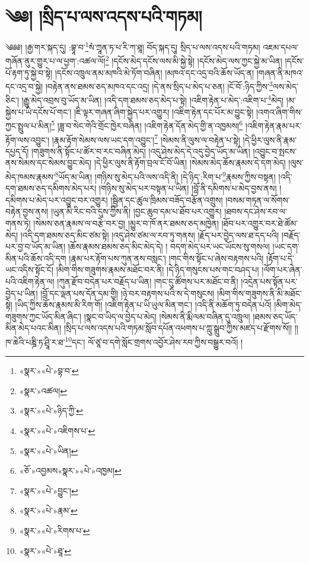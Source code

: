 \chapter{༄༅། །སྲིད་པ་ལས་འདས་པའི་གཏམ།}༄༅༅། །རྒྱ་གར་སྐད་དུ། :བྷཱ་བ་\footnote{«སྣར་»«པེ་»བྷ་བ་}སཾ་ཀྲཱན་ཏ་པ་རི་ཀ་ཐཱ། བོད་སྐད་དུ། སྲིད་པ་ལས་འདས་པའི་གཏམ། འཇམ་དཔལ་གཞོན་ནུར་གྱུར་པ་ལ་ཕྱག་:འཚལ་ལོ།\footnote{«སྣར་»འཚལ།} །དངོས་མེད་དངོས་ལས་མི་སྐྱེ་སྟེ། །དངོས་མེད་ལས་ཀྱང་སྐྱེ་མ་ཡིན། །དངོས་པོ་རྟག་ཏུ་སྐྱེ་བ་སྟེ། །དངོས་འཁྲུལ་ནམ་མཁའི་མེ་ཏོག་བཞིན། །མཁའ་དང་འདྲ་བའི་ཆོས་ཡོད་ན། །གཞན་ནི་མཁའ་དང་འདྲ་བ་སྐྱེ། །བརྟེན་ནས་ཐམས་ཅད་མཁའ་དང་འདྲ། །དེ་ནས་སྲིད་པ་མེད་པ་ཅན། །ངོ་བོ་:ཉིད་ཀྱིས་\footnote{«སྣར་»«པེ་»ཉིད་ཀྱི་}ལས་མེད་ཅིང་། །རྒྱུ་མེད་འབྲས་བུ་ཡོད་མ་ཡིན། །འདི་དག་ཐམས་ཅད་མེད་པ་སྟེ། །འཇིག་རྟེན་པ་མེད་:འཇིག་པ་\footnote{«སྣར་»«པེ་»འཇིགས་པ་}མེད། །མ་སྐྱེས་པ་ཡི་དངོས་པོ་གང་། །ཇི་ལྟར་གཞན་ཞིག་སྐྱེད་པར་འགྱུར། །འཇིག་རྟེན་དང་པོར་མ་བྱུང་སྟེ། །འགའ་ཞིག་གིས་ཀྱང་སྤྲུལ་པ་མིན།\footnote{«སྣར་»«པེ་»ཡིན།} །ཟླ་བ་སེང་གེའི་གྲོང་ཁྱེར་བཞིན། །འཇིག་རྟེན་དོན་མེད་གྱི་ན་འཁྱམས།\footnote{«ཅོ་»འབྱམས«སྣར་»«པེ་»འཁྱམ།} །འཇིག་རྟེན་རྣམ་པར་རྟོག་ལས་འབྱུང་། །རྣམ་རྟོག་སེམས་ལས་ཡང་དག་འབྱུང་།\footnote{«སྣར་»«པེ་»བྱུང་།} །སེམས་ནི་ལུས་ལ་བརྟེན་པ་སྟེ། །དེ་ཕྱིར་ལུས་ནི་རྣམ་དཔྱད་དོ། །གཟུགས་ནི་སྟོང་པ་ཚོར་བ་རང་བཞིན་མེད། །འདུ་ཤེས་མེད་དེ་འདུ་བྱེད་ཡོད་མ་ཡིན། །འབྱུང་བ་སྤངས་ནས་སེམས་དང་སེམས་བྱུང་མེད། །དེ་ཕྱིར་ལུས་ནི་རྟོག་བྲལ་ངོ་བོ་ཡིན། །སེམས་མེད་ཆོས་རྣམས་དེ་དག་མེད། །ལུས་མེད་ཁམས་རྣམས་\footnote{«སྣར་»«པེ་»རྣམ་}ཡོད་མ་ཡིན། །གཉིས་སུ་མེད་པའི་ལས་འདི་ནི། །དེ་ཉིད་:རིག་པ་\footnote{«སྣར་»«པེ་»རིགས་པ་}རྣམས་ཀྱིས་བསྟན། །འདི་དག་ཐམས་ཅད་དམིགས་མེད་པར། །གཉིས་སུ་མེད་པར་བསྟན་པ་ཡིན། །བློ་ནི་དམིགས་པ་མེད་བྱས་ནས། །དམིགས་པ་མེད་པར་འབྱུང་བར་འགྱུར། །སྦྱིན་དང་ཚུལ་ཁྲིམས་བཟོད་བརྩོན་འགྲུས། །བསམ་གཏན་ལ་སོགས་བརྟེན་བྱས་ནས། །ཡུན་མི་རིང་བའི་དུས་ཀྱིས་ནི། །བྱང་ཆུབ་དམ་པ་ཐོབ་པར་འགྱུར། །ཐབས་དང་ཤེས་རབ་ལ་གནས་ཏེ། །སེམས་ཅན་རྣམས་ལ་བརྩེ་བར་བྱ། །མྱུར་བ་ཁོ་ནར་ཐམས་ཅད་མཁྱེན། །ཐོབ་པར་འགྱུར་བར་ཐེ་ཚོམ་མེད། །འདི་དག་ཐམས་ཅད་མིང་ཙམ་སྟེ། །འདུ་ཤེས་ཙམ་ལ་རབ་ཏུ་གནས། །རྗོད་པར་བྱེད་ལས་ཐ་དད་པའི། །བརྗོད་པར་བྱ་བ་ཡོད་མ་ཡིན། །ཆོས་རྣམས་ཐམས་ཅད་མིང་མེད་དེ། །
བདག་མེད་པར་ཡང་ཡོངས་སུ་གསལ། །ཡང་དག་མིན་པའི་ཆོས་འདི་དག །རྣམ་པར་རྟོག་པས་ཀུན་ནས་བསླང་། །གང་གིས་སྟོང་པ་ཞེས་བརྟགས་པའི། །རྟོག་པ་དེ་ཡང་འདིས་སྟོང་ངོ། །མིག་གིས་གཟུགས་རྣམས་མཐོང་བར་ནི། །དེ་ཉིད་གསུངས་པས་གང་བཤད་པ། །ལོག་པར་ཞེན་པའི་འཇིག་རྟེན་ལ། །ཀུན་རྫོབ་བདེན་པར་བརྗོད་པ་ཡིན། །གང་དུ་ཚོགས་པར་མཐོང་བ་ནི། །འདྲེན་པས་སྟོན་པར་བྱེད་པ་ཡིན། །བློ་དང་ལྡན་པས་དོན་དམ་གྱི། །ཉེ་བར་བརྟགས་པའི་ས་དེ་གསུངས། །མིག་གིས་གཟུགས་ནི་མི་མཐོང་སྟེ། །ཡིད་ཀྱིས་ཆོས་རྣམས་མི་རིག་གོ། །འཇིག་རྟེན་པ་ཡི་ཡུལ་མིན་གང་། །འདི་ནི་མཆོག་ཏུ་བདེན་པའོ། །མིག་མེད་གཟུགས་ཀྱང་ཡོད་མིན་ཞིང་། །སྣང་བ་ཡིད་ལ་བྱེད་པ་མེད། །སེམས་ནི་རྨི་ལམ་བཞིན་དུ་འཁྲུལ། །ཐམས་ཅད་ཡོད་མིན་མེད་པའང་མིན། །སྲིད་པ་ལས་འདས་པའི་གཏམ་སློབ་དཔོན་འཕགས་པ་ཀླུ་སྒྲུབ་ཀྱིས་མཛད་པ་རྫོགས་སོ།། །།ཁ་ཆེའི་པཎྜི་ཏ་ཤྲཱི་ར་ཐ་\footnote{«སྣར་»«པེ་»ཐཱ་}དང་། ལོ་ཙཱ་བ་དགེ་སློང་གྲགས་འབྱོར་ཤེས་རབ་ཀྱིས་བསྒྱུར་བའོ། ། 